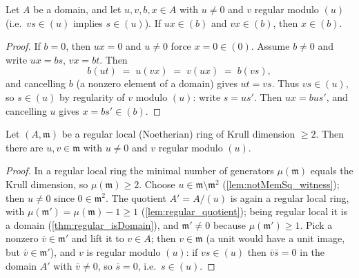 \begin{lemma}
  \label{lem:swap_lemma}
  \leanok
  Let \(A\) be a domain, and let \(u, v, b, x \in A\) with \(u \neq 0\) and
  \(v\) regular modulo \((u)\) (i.e.\ \(v s \in (u)\) implies \(s \in (u)\)).
  If \(u x \in (b)\) and \(v x \in (b)\), then \(x \in (b)\).
\end{lemma}
\begin{proof}
  \leanok
  If \(b = 0\), then \(u x = 0\) and \(u \neq 0\) force \(x = 0 \in (0)\).
  Assume \(b \neq 0\) and write \(u x = b s\), \(v x = b t\). Then
  \[
    b (u t) \;=\; u (v x) \;=\; v (u x) \;=\; b (v s),
  \]
  and cancelling \(b\) (a nonzero element of a domain) gives \(u t = v s\).
  Thus \(v s \in (u)\), so \(s \in (u)\) by regularity of \(v\) modulo
  \((u)\): write \(s = u s'\). Then \(u x = b u s'\), and cancelling \(u\)
  gives \(x = b s' \in (b)\).
\end{proof}

\begin{theorem}
  \label{thm:swap_pair_exists}
  \leanok
  Let \((A, \mathfrak m)\) be a regular local (Noetherian) ring of Krull
  dimension \(\geq 2\). Then there are \(u, v \in \mathfrak m\) with
  \(u \neq 0\) and \(v\) regular modulo \((u)\).
\end{theorem}
\begin{proof}
  \leanok
  In a regular local ring the minimal number of generators
  \(\mu(\mathfrak m)\) equals the Krull dimension, so
  \(\mu(\mathfrak m) \geq 2\). Choose
  \(u \in \mathfrak m \setminus \mathfrak m^2\)
  (\ref{lem:notMemSq_witness}); then \(u \neq 0\) since
  \(0 \in \mathfrak m^2\). The quotient \(A' = A/(u)\) is again a regular local
  ring, with \(\mu(\mathfrak m') = \mu(\mathfrak m) - 1 \geq 1\)
  (\ref{lem:regular_quotient}); being regular local it is a domain
  (\ref{thm:regular_isDomain}), and \(\mathfrak m' \neq 0\) because
  \(\mu(\mathfrak m') \geq 1\). Pick a nonzero \(\bar v \in \mathfrak m'\) and
  lift it to \(v \in A\); then \(v \in \mathfrak m\) (a unit would have a unit
  image, but \(\bar v \in \mathfrak m'\)), and \(v\) is regular modulo
  \((u)\): if \(v s \in (u)\) then \(\bar v \bar s = 0\) in the domain \(A'\)
  with \(\bar v \neq 0\), so \(\bar s = 0\), i.e.\ \(s \in (u)\).
\end{proof}

